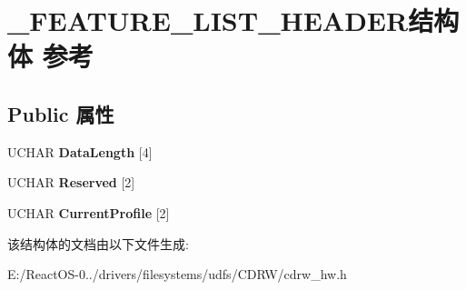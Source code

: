 \hypertarget{struct___f_e_a_t_u_r_e___l_i_s_t___h_e_a_d_e_r}{}\section{\+\_\+\+F\+E\+A\+T\+U\+R\+E\+\_\+\+L\+I\+S\+T\+\_\+\+H\+E\+A\+D\+E\+R结构体 参考}
\label{struct___f_e_a_t_u_r_e___l_i_s_t___h_e_a_d_e_r}
\subsection*{Public 属性}
\begin{DoxyCompactItemize}
\item 
\mbox{\label{struct___f_e_a_t_u_r_e___l_i_s_t___h_e_a_d_e_r_a252c77e84eb81d63afc105068d97ddc5}} 
U\+C\+H\+AR {\bfseries Data\+Length} \mbox{[}4\mbox{]}
\item 
\mbox{\label{struct___f_e_a_t_u_r_e___l_i_s_t___h_e_a_d_e_r_a5c1943ec3e9a2a04f4c7c4594f341096}} 
U\+C\+H\+AR {\bfseries Reserved} \mbox{[}2\mbox{]}
\item 
\mbox{\label{struct___f_e_a_t_u_r_e___l_i_s_t___h_e_a_d_e_r_a3bb39ef5d56c78bc4e354dfae9f8da5e}} 
U\+C\+H\+AR {\bfseries Current\+Profile} \mbox{[}2\mbox{]}
\end{DoxyCompactItemize}


该结构体的文档由以下文件生成\+:\begin{DoxyCompactItemize}
\item 
E\+:/\+React\+O\+S-\/0../drivers/filesystems/udfs/\+C\+D\+R\+W/cdrw\+\_\+hw.\+h\end{DoxyCompactItemize}
